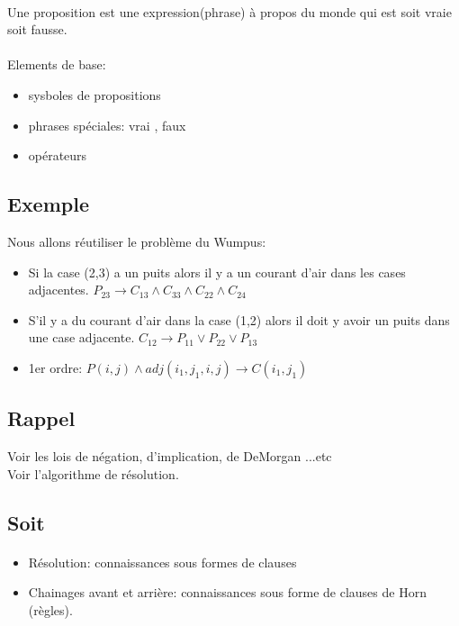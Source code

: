\documentclass{article}
\begin{document}
\paragraph{}
Une proposition est une expression(phrase) à propos du monde qui est soit vraie soit fausse. 

\paragraph{}
Elements de base:
\begin{itemize}
	\item sysboles de propositions
	\item phrases spéciales: vrai , faux
	\item opérateurs
\end{itemize}

\subsection{Exemple}
Nous allons réutiliser le problème du Wumpus:
\begin{itemize}
	\item Si la case (2,3) a un puits alors il  y a un courant d'air dans les cases adjacentes.
		$P_{23} \rightarrow C_{13} \land C_{33} \land C_{22} \land C_{24}$
	\item S'il y a du courant d'air dans la case (1,2) alors il doit y avoir un puits dans une case adjacente.
		$C_{12} \rightarrow P_{11} \lor  P_{22} \lor P_{13}$
	\item 1er ordre: $P(i,j) \land adj(i_{1}, j_{1}, i, j) \rightarrow C(i_{1}, j_{1})$
\end{itemize}

\subsection{Rappel}
Voir les lois de négation, d'implication, de DeMorgan ...etc \\
Voir l'algorithme de résolution.

\subsection{Soit}
\paragraph{}
\begin{itemize}
	\item Résolution: connaissances sous formes de clauses
	\item Chainages avant et arrière: connaissances sous forme de clauses de Horn (règles).
\end{itemize}

\subsection{}
\paragraph{}
\end{document}
